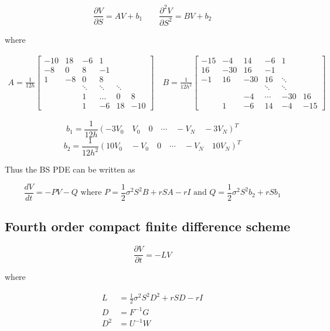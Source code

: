 \documentclass[12pt]{article}
\begin{document}
$$
\frac{\partial V}{\partial S}=A V+b_{1} \quad \quad \frac{\partial^{2} V}{\partial S^{2}}=B V+b_{2}
$$

where

$$
\begin{gathered}
A=\frac{1}{12 h}\left[\begin{array}{cccccc}
-10 & 18 & -6 & 1 & & \\
-8 & 0 & 8 & -1 & & \\
1 & -8 & 0 & 8 & & \\
& & \ddots & \ddots & \ddots & \\
& & 1 & \ldots & 0 & 8 \\
& & 1 & -6 & 18 & -10
\end{array}\right] \quad B=\frac{1}{12 h^{2}}\left[\begin{array}{cccccc}
-15 & -4 & 14 & -6 & 1 & \\
16 & -30 & 16 & -1 & & \\
-1 & 16 & -30 & 16 & \ddots & \\
& & & \ddots & \ddots & \\
& & -4 & \cdots & -30 & 16\\
& 1 & -6 & 14 & -4 & -15
\end{array}\right]
\end{gathered}
$$

$$b_{1}=\frac{1}{12 h}\left(-3 V_{0} \quad V_{0} \quad 0 \quad \cdots \quad -V_{N} \quad -3 V_{N}\right)^{T}$$ 
$$b_{2}=\frac{1}{12 h^{2}}\left(10 V_{0} \quad -V_{0} \quad 0 \quad \cdots \quad -V_{N} \quad 10 V_{N}\right)^{T}$$

Thus the BS PDE can be written as

$$
\frac{d V}{d t}=-P V-Q \text { where } P=\frac{1}{2} \sigma^{2} S^{2} B+r S A-r I \text { and } Q=\frac{1}{2} \sigma^{2} S^{2} b_{2}+r S b_{1}
$$

\subsection{Fourth order compact finite difference scheme}

$$
\frac{\partial V}{\partial t}=-L V
$$

where

$$
\begin{aligned}
L &=\frac{1}{2} \sigma^{2} S^{2} D^{2}+r S D-r I \\
D &=F^{-1} G \\
D^{2} &=U^{-1} W
\end{aligned}
$$
\end{document}

